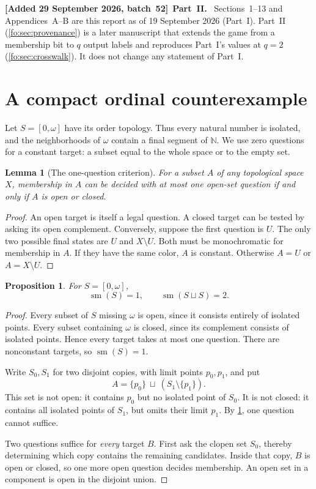 \documentclass[11pt,letterpaper]{article}
\numberwithin{equation}{section}
\newtheorem{proposition}[proposition]{Proposition}
\newtheorem{lemma}[lemma]{Lemma}
\theoremstyle{definition}
\theoremstyle{remark}
\theoremstyle{definition}
\newcommand{\sm}{\operatorname{sm}}
\newcommand{\N}{\mathbb N}
\newenvironment{writenote}[1][]{\par\smallskip\begingroup\small\sloppy
 \noindent\textbf{[Added 29 September 2026, batch~52]}\if\relax\detokenize{#1}\relax\else~\textbf{#1.}\fi\ }%
 {\par\endgroup\smallskip}
\begin{document}
\begin{writenote}[Part~II]
Sections~1--13 and Appendices~A--B are this report as of 19 September 2026
(Part~I). Part~II (\cref{fo:sec:provenance}) is a later manuscript that
extends the game from a membership bit to $q$ output labels and reproduces
Part~I's values at $q=2$ (\cref{fo:sec:crosswalk}). It does not change any
statement of Part~I.
\end{writenote}

\section{A compact ordinal counterexample}\label{sec:small}

Let $S=[0,\omega]$ have its order topology. Thus every natural number is isolated,
and the neighborhoods of $\omega$ contain a final segment of $\N$.
We use zero questions for a constant target: a subset equal to the whole space
or to the empty set.

\begin{lemma}[The one-question criterion]\label{lem:one}
For a subset $A$ of any topological space $X$, membership in $A$ can be decided
with at most one open-set question if and only if $A$ is open or closed.
\end{lemma}
\begin{proof}
An open target is itself a legal question. A closed target can be tested by
asking its open complement. Conversely, suppose the first question is $U$.
The only two possible final states are $U$ and $X\setminus U$. Both must be
monochromatic for membership in $A$. If they have the same color, $A$ is
constant. Otherwise $A=U$ or $A=X\setminus U$.
\end{proof}

\begin{proposition}\label{prop:small}
For $S=[0,\omega]$,
\begin{equation}\label{eq:small}
 \sm(S)=1,\qquad \sm(S\sqcup S)=2.
\end{equation}
\end{proposition}
\begin{proof}
Every subset of $S$ missing $\omega$ is open, since it consists entirely of
isolated points. Every subset containing $\omega$ is closed, since its complement
consists of isolated points. Hence every target takes at most one question.
There are nonconstant targets, so $\sm(S)=1$.

Write $S_0,S_1$ for two disjoint copies, with limit points $p_0,p_1$, and put
\[
 A=\{p_0\}\ \sqcup\ (S_1\setminus\{p_1\}).
\]
This set is not open: it contains $p_0$ but no isolated point of $S_0$.
It is not closed: it contains all isolated points of $S_1$, but omits their
limit $p_1$. By \cref{lem:one}, one question cannot suffice.

Two questions suffice for \emph{every} target $B$. First ask the clopen set
$S_0$, thereby determining which copy contains the remaining candidates.
Inside that copy, $B$ is open or closed, so one more open question decides
membership. An open set in a component is open in the disjoint union.
\end{proof}
\end{document}
